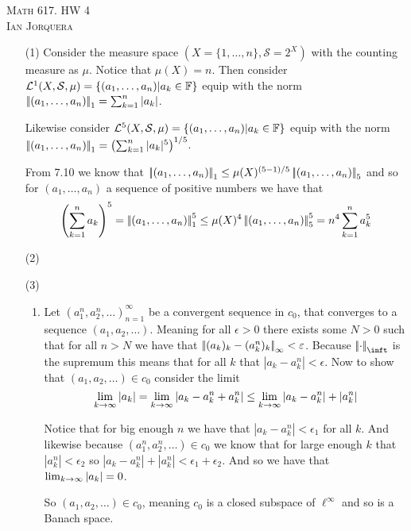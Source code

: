 \documentclass[12pt]{amsart}
\begin{document}
\begin{center}
   \textsc{Math 617. HW 4\\ Ian Jorquera}
\end{center}
\vspace{1em}

\begin{itemize}
   \item[(1)] Consider the measure space $(X=\{1,\dots,n\},\mathcal S=2^X)$ with the counting measure 
   as $\mu$. Notice that $\mu(X)=n$. Then consider $\mathcal L^1 (X,\mathcal S, \mu)=\{(a_1,\dots,a_n)|a_k\in \mathbb{F}\}$
   equip with the norm $\norm{(a_1,\dots,a_n)}_1=\sum_{k=1}^{n}|a_k|$.
   
   Likewise consider $\mathcal L^5 (X,\mathcal S, \mu)=\{(a_1,\dots,a_n)|a_k\in \mathbb{F}\}$ equip with the 
   norm $\norm{(a_1,\dots,a_n)}_1=\left(\sum_{k=1}^{n}|a_k|^5\right)^{1/5}$.

   From 7.10 we know that $\norm{(a_1,\dots,a_n)}_1\leq \mu(X)^{(5-1)/5}\norm{(a_1,\dots,a_n)}_5$ and so for 
   $(a_1,\dots,a_n)$ a sequence of positive numbers we have that
   \[\left(\sum_{k=1}^{n}a_k\right)^5=\norm{(a_1,\dots,a_n)}_1^5\leq \mu(X)^{4}\norm{(a_1,\dots,a_n)}_5^5=n^4\sum_{k=1}^{n}a_k^5\]


   \item[(2)] 
   \item[(3)]
   \begin{enumerate}[label=(\alph*)]
    \item Let $(a^n_1,a^n_2,\dots)_{n=1}^{\infty}$ be a convergent sequence in $c_0$, that converges 
    to a sequence $(a_1,a_2,\dots)$. Meaning for all $\epsilon>0$ there exists some $N>0$ such that for all $n>N$ we have that
    $\norm{(a_k)_k-(a^n_k)_k}_\infty<\epsilon$. Because $\norm{\cdot}_\inft$ is the supremum this means that
    for all $k$ that $|a_k-a_k^n|<\epsilon$.
    Now to show that $(a_1,a_2,\dots)\in c_0$ consider the limit
    \[\lim_{k\rightarrow\infty}|a_k|=\lim_{k\rightarrow\infty}|a_k-a^n_k+a^n_k|\leq\lim_{k\rightarrow\infty}|a_k-a^n_k|+|a^n_k|\]

    Notice that for big enough $n$ we have that $|a_k-a_k^n|<\epsilon_1$ for all $k$. And likewise because $(a^n_1,a^n_2,\dots)\in c_0$ we know that
    for large enough $k$ that $|a^n_k|<\epsilon_2$ so $|a_k-a^n_k|+|a^n_k|<\epsilon_1+\epsilon_2$. And so we have that $\lim_{k\rightarrow\infty}|a_k|=0$.

    So $(a_1,a_2,\dots)\in c_0$, meaning $c_0$ is a closed 
    subspace of $\ell^\infty$ and so is a Banach space.




\end{enumerate}
\end{itemize}
\end{document}
